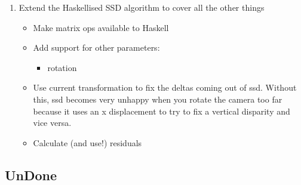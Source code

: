 \begin{enumerate}
\item
Extend the Haskellised SSD algorithm to cover all the other things
\begin{itemize}
\item
Make matrix ops available to Haskell

\item
Add support for other parameters:
\begin{itemize}
\item rotation
\end{itemize}

\item
Use current transformation to fix the deltas coming out of ssd.
Without this, ssd becomes very unhappy when you rotate the camera
too far because it uses an x displacement to try to fix a vertical
disparity and vice versa.

\item
Calculate (and use!) residuals

\end{itemize}
\end{enumerate}

\subsection{UnDone}

